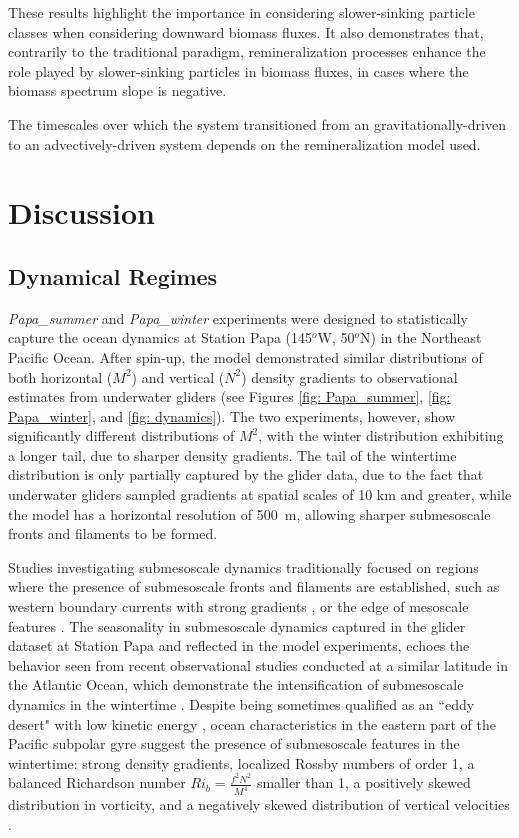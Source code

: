 \documentclass[article,linenumbers]{agujournal2018}
\begin{document}
	These results highlight the importance in considering slower-sinking particle classes when considering downward biomass fluxes. It also demonstrates that, contrarily to the traditional paradigm, remineralization processes enhance the role played by slower-sinking particles in biomass fluxes, in cases where the biomass spectrum slope is negative. 
	
	The timescales over which the system transitioned from an gravitationally-driven to an advectively-driven system depends on the remineralization model used. 
	
	\section{Discussion}
	\label{sec: Discussion}
	
	\subsection{Dynamical Regimes}
	\label{sec: Discussion_model}
	\textit{Papa\_summer} and \textit{Papa\_winter} experiments were designed to statistically capture the ocean dynamics at Station Papa (145$^o$W, 50$^o$N) in the Northeast Pacific Ocean. After spin-up, the model demonstrated similar distributions of both horizontal ($M^2$) and vertical ($N^2$) density gradients to observational estimates from underwater gliders (see Figures \ref{fig: Papa_summer}, \ref{fig: Papa_winter}, and \ref{fig: dynamics}). The two experiments, however, show significantly different distributions of $M^2$, with the winter distribution exhibiting a longer tail, due to sharper density gradients. The tail of the wintertime distribution is only partially captured by the glider data, due to the fact that underwater gliders sampled gradients at spatial scales of 10 km and greater, while the model has a horizontal resolution of 500~m, allowing sharper submesoscale fronts and filaments to be formed.
	
	Studies investigating submesoscale dynamics traditionally focused on regions where the presence of submesoscale fronts and filaments are established, such as western boundary currents with strong gradients \citep{Dasaro_2011, Thomas_2013}, or the edge of mesoscale features \citep{vanHaren_2006,Waite_2016}. The seasonality in submesoscale dynamics captured in the glider dataset at Station Papa and reflected in the model experiments, echoes the behavior seen from recent observational studies conducted at a similar latitude in the Atlantic Ocean, which demonstrate the intensification of submesoscale dynamics in the wintertime \citep{Thompson_2016, Buckingham_2016}. Despite being sometimes qualified as an ``eddy desert" with low kinetic energy \citep{Chelton_2011}, ocean characteristics in the eastern part of the Pacific subpolar gyre suggest the presence of submesoscale features in the wintertime: strong density gradients, localized Rossby numbers of order 1, a balanced Richardson number $Ri_b = \frac{f^2N^2}{M^4}$ smaller than 1, a positively skewed distribution in vorticity, and a negatively skewed distribution of vertical velocities \citep[see Figure \ref{fig: dynamics};][]{Thomas_2013b,Rudnick_2001, Buckingham_2016}.
	
\end{document}
